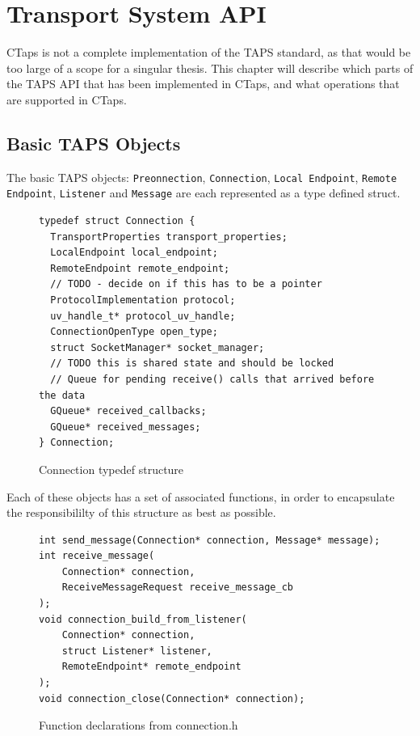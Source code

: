 \chapter{Transport System API} \label{transportSystemApi}
CTaps is not a complete implementation of the TAPS standard,
as that would be too large of a scope for a singular thesis.
This chapter will describe which parts of the TAPS API that has
been implemented in CTaps, and what operations that are supported
in CTaps.

\section{Basic TAPS Objects}
The basic TAPS objects:
\texttt{Preonnection}, \texttt{Connection}, \texttt{Local Endpoint}, \texttt{Remote Endpoint}, 
\texttt{Listener} and \texttt{Message} are each represented as a type defined
struct.

\begin{figure}[H]
\begin{verbatim}
typedef struct Connection {
  TransportProperties transport_properties;
  LocalEndpoint local_endpoint;
  RemoteEndpoint remote_endpoint;
  // TODO - decide on if this has to be a pointer
  ProtocolImplementation protocol;
  uv_handle_t* protocol_uv_handle;
  ConnectionOpenType open_type;
  struct SocketManager* socket_manager;
  // TODO this is shared state and should be locked
  // Queue for pending receive() calls that arrived before the data
  GQueue* received_callbacks;
  GQueue* received_messages;
} Connection;

\end{verbatim}
\caption{Connection typedef structure}
\end{figure} 

Each of these objects has a set of associated functions, in order to encapsulate
the responsibililty of this structure as best as possible. 

\begin{figure}[H]
\begin{verbatim}
int send_message(Connection* connection, Message* message);
int receive_message(
    Connection* connection,
    ReceiveMessageRequest receive_message_cb
);
void connection_build_from_listener(
    Connection* connection,
    struct Listener* listener,
    RemoteEndpoint* remote_endpoint
);
void connection_close(Connection* connection);
\end{verbatim}
\caption{Function declarations from connection.h}
\end{figure}

